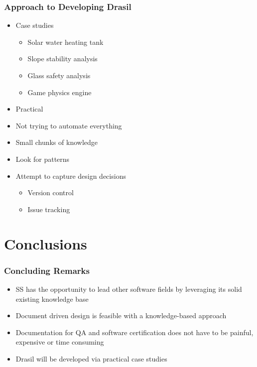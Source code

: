 \documentclass{beamer}
\begin{document}

\begin{frame}

\frametitle{Approach to Developing Drasil}

\begin{itemize}
\item Case studies
\begin{itemize}
\item Solar water heating tank
\item Slope stability analysis
\item Glass safety analysis
\item Game physics engine
\end{itemize}
\item Practical
\item Not trying to automate everything %
\item Small chunks of knowledge
\item Look for patterns
\item Attempt to capture design decisions
\begin{itemize}
\item Version control
\item Issue tracking
\end{itemize}
\end{itemize}

\end{frame}


\section[Conclusions]{Conclusions}


\begin{frame}

\frametitle{Concluding Remarks}

\begin{itemize}
\item SS has the opportunity to lead other software fields by leveraging its
  solid existing knowledge base
\item Document driven design is feasible with a knowledge-based approach
\item Documentation for QA and software certification does not have to be
  painful, expensive or time consuming
\item Drasil will be developed via practical case studies
\end{itemize}
\end{frame}

\end{document}
